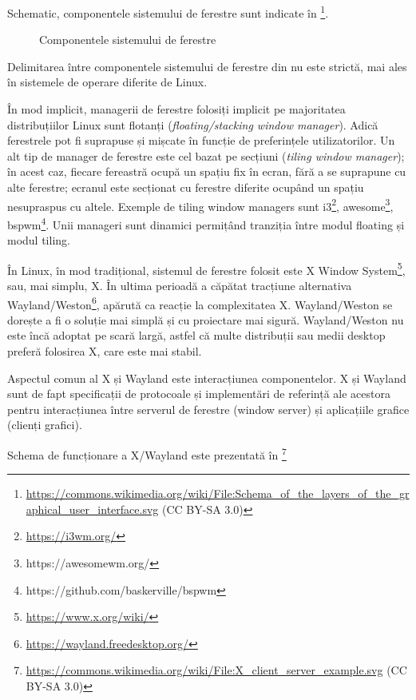 Schematic, componentele sistemului de ferestre sunt indicate în \footnote{\url{https://commons.wikimedia.org/wiki/File:Schema_of_the_layers_of_the_graphical_user_interface.svg} (CC BY-SA 3.0)}.

\begin{figure}[htbp]
  \centering
  \def\svgwidth{\columnwidth}
  
  \caption{Componentele sistemului de ferestre}
  \label{fig:ui:window-system}
\end{figure}

Delimitarea între componentele sistemului de ferestre din  nu este strictă, mai ales în sistemele de operare diferite de Linux.

În mod implicit, managerii de ferestre folosiți implicit pe majoritatea distribuțiilor Linux sunt flotanți (\textit{floating/stacking window manager}).
Adică ferestrele pot fi suprapuse și mișcate în funcție de preferințele utilizatorilor.
Un alt tip de manager de ferestre este cel bazat pe secțiuni (\textit{tiling window manager});
în acest caz, fiecare fereastră ocupă un spațiu fix în ecran, fără a se suprapune cu alte ferestre;
ecranul este secționat cu ferestre diferite ocupând un spațiu nesupraspus cu altele.
Exemple de tiling window managers sunt i3\footnote{\url{https://i3wm.org/}}, awesome\footnote{https://awesomewm.org/}, bspwm\footnote{https://github.com/baskerville/bspwm}.
Unii manageri sunt dinamici permițând tranziția între modul floating și modul tiling.

În Linux, în mod tradițional, sistemul de ferestre folosit este X Window System\footnote{\url{https://www.x.org/wiki/}}, sau, mai simplu, X.
În ultima perioadă a căpătat tracțiune alternativa Wayland/Weston\footnote{\url{https://wayland.freedesktop.org/}}, apărută ca reacție la complexitatea X.
Wayland/Weston se dorește a fi o soluție mai simplă și cu proiectare mai sigură.
Wayland/Weston nu este încă adoptat pe scară largă, astfel că multe distribuții sau medii desktop preferă folosirea X, care este mai stabil.

Aspectul comun al X și Wayland este interacțiunea componentelor.
X și Wayland sunt de fapt specificații de protocoale și implementări de referință ale acestora pentru interacțiunea între serverul de ferestre (window server) și aplicațiile grafice (clienți grafici).

Schema de funcționare a X/Wayland este prezentată în \footnote{\url{https://commons.wikimedia.org/wiki/File:X_client_server_example.svg} (CC BY-SA 3.0)}

